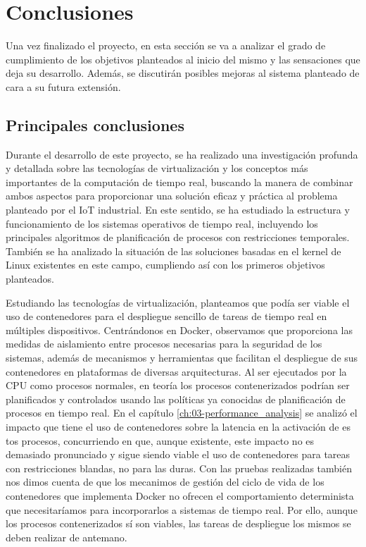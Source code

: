 \chapter{Conclusiones}
Una vez finalizado el proyecto, en esta sección se va a analizar el grado de
cumplimiento de los objetivos planteados al inicio del mismo y las sensaciones
que deja su desarrollo. Además, se discutirán posibles mejoras al sistema
planteado de cara a su futura extensión.

\section{Principales conclusiones}

Durante el desarrollo de este proyecto, se ha realizado una investigación
profunda y detallada sobre las tecnologías de virtualización y los conceptos más
importantes de la computación de tiempo real, buscando la manera de combinar
ambos aspectos para proporcionar una solución eficaz y práctica al problema
planteado por el IoT industrial. En este sentido, se ha estudiado la estructura
y funcionamiento de los sistemas operativos de tiempo real, incluyendo los
principales algoritmos de planificación de procesos con restricciones
temporales. También se ha analizado la situación de las soluciones basadas en
el kernel de Linux existentes en este campo, cumpliendo así con los primeros
objetivos planteados.

Estudiando las tecnologías de virtualización, planteamos que podía ser viable el
uso de contenedores para el despliegue sencillo de tareas de tiempo real en
múltiples dispositivos. Centrándonos en Docker, observamos que proporciona las
medidas de aislamiento entre procesos necesarias para la seguridad de los
sistemas, además de mecanismos y herramientas que facilitan el despliegue de sus
contenedores en plataformas de diversas arquitecturas. Al ser ejecutados por la
CPU como procesos normales, en teoría los procesos contenerizados podrían ser
planificados y controlados usando las políticas ya conocidas de planificación de
procesos en tiempo real. En el capítulo \ref{ch:03-performance_analysis} se
analizó el impacto que tiene el uso de contenedores sobre la latencia en la
activación de es tos procesos, concurriendo en que, aunque existente, este
impacto no es demasiado pronunciado y sigue siendo viable el uso de contenedores
para tareas con restricciones blandas, no para las duras. Con las pruebas
realizadas también nos dimos cuenta de que los mecanimos de gestión del ciclo de
vida de los contenedores que implementa Docker no ofrecen el comportamiento
determinista que necesitaríamos para incorporarlos a sistemas de tiempo real.
Por ello, aunque los procesos contenerizados sí son viables, las tareas de
despliegue los mismos se deben realizar de antemano.

